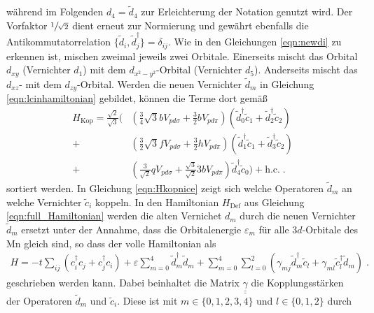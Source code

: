 während im Folgenden $d_4 = \tilde{d}_4$ zur Erleichterung der Notation genutzt wird. 
Der Vorfaktor $\sfrac{1}{\sqrt{2}}$ dient erneut zur Normierung und gewährt ebenfalls die Antikommutatorrelation $\{ \tilde{d}_i, \tilde{d}^\dagger_j \} = \delta_{ij}$.
Wie in den Gleichungen \eqref{eqn:newdi} zu erkennen ist, mischen zweimal jeweils zwei Orbitale.
Einerseits mischt das Orbital $d_{xy}$ (Vernichter $d_1$) mit dem $d_{x^2-y^2}$-Orbital (Vernichter $d_5$).
Anderseits mischt das $d_{xz}$- mit dem $d_{zy}$-Orbital.
Werden die neuen Vernichter $\tilde{d}_m$ in Gleichung \eqref{eqn:lcinhamiltonian} gebildet, können die Terme dort gemäß
\begin{equation}
            \begin{split}
                H_\text{Kop} = \frac{\sqrt{2}}{\sqrt{3}}  \biggl(
                & \left ( \frac{3}{4}\sqrt{3} b V_{pd\sigma} + \frac{3}{2}  b   V_{pd\pi} \right )      \left ( \tilde{d}^\dagger_0 \tilde{c}_1 + \tilde{d}^\dagger_2 \tilde{c}_2 \right )   \\
            +    & \left ( \frac{3}{2}\sqrt{3} f V_{pd\sigma} + \frac{3}{2}  h   V_{pd\pi} \right )     \left ( \tilde{d}^\dagger_1 \tilde{c}_1 + \tilde{d}^\dagger_3 \tilde{c}_2 \right )   \\
            +    & \left ( \frac{3}{\sqrt{2}} q V_{pd\sigma} + \frac{\sqrt{3}}{\sqrt{2}} 3 b V_{pd\pi} \right ) \tilde{d}^\dagger_4 \tilde{c}_0 \biggr) + \text{h.c.} \; .
            \end{split}
            \label{eqn:Hkopnice}
\end{equation}
sortiert werden.
In Gleichung \eqref{eqn:Hkopnice} zeigt sich welche Operatoren $\tilde{d}_m$ an welche Vernichter $\tilde{c}_i$ koppeln.
In den Hamiltonian $H_\text{Def}$ aus Gleichung \eqref{eqn:full_Hamiltonian} werden die alten Vernichet $d_m$ durch die neuen Vernichter $\tilde{d}_m$ ersetzt unter 
der Annahme, dass die Orbitalenergie $\varepsilon_m$ für alle $3d$-Orbitale des Mn gleich sind, so dass der volle Hamiltonian als
\begin{align}
    H = -t\sum_{ij}(c^\dagger_i c_j + c^\dagger_j c_i) + \varepsilon \sum_{m=0}^4 \tilde{d}^\dagger_m \tilde{d}_m +
    \sum_{m=0}^4\sum_{l=0}^2(\gamma_{mj} \tilde{d}^\dagger_m \tilde{c}_l + \gamma_{ml} \tilde{c}^\dagger_l \tilde{d}_m) \; .
\end{align}
geschrieben werden kann.
Dabei beinhaltet die Matrix $\underline{\underline{\gamma}}$ die Kopplungsstärken der Operatoren $\tilde{d}_m$ und $\tilde{c}_i$.
Diese ist mit $m \in \{ 0,1,2,3,4 \}$ und $l \in \{ 0,1,2 \}$ durch
